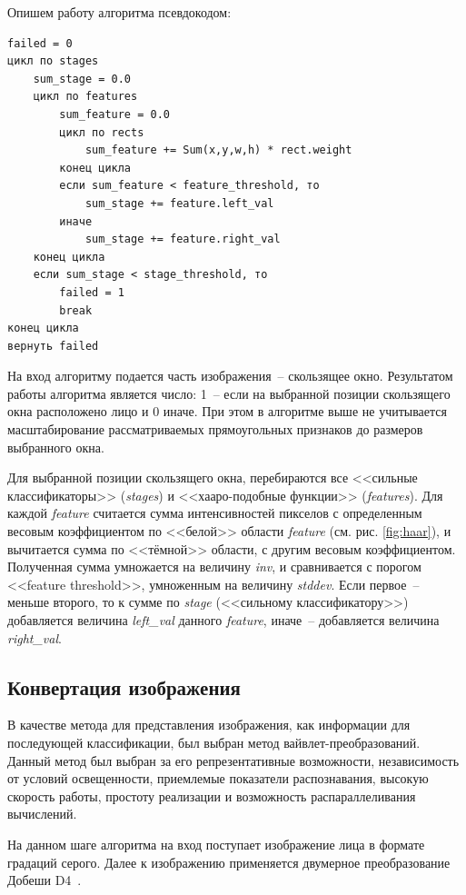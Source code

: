 Опишем работу алгоритма псевдокодом:
\begin{verbatim}
failed = 0
цикл по stages
    sum_stage = 0.0
    цикл по features
        sum_feature = 0.0
        цикл по rects
            sum_feature += Sum(x,y,w,h) * rect.weight
        конец цикла
        если sum_feature < feature_threshold, то
            sum_stage += feature.left_val
        иначе
            sum_stage += feature.right_val
    конец цикла
    если sum_stage < stage_threshold, то
        failed = 1
        break
конец цикла
вернуть failed
\end{verbatim}

На вход алгоритму подается часть изображения~-- скользящее окно.
Результатом работы алгоритма является число: 1~-- если на выбранной позиции скользящего окна расположено лицо и 0 иначе.
При этом в алгоритме выше не учитывается масштабирование рассматриваемых прямоугольных признаков
до размеров выбранного окна.

Для выбранной позиции скользящего окна, перебираются все <<сильные
классификаторы>> (\textit{stages}) и <<хааро-подобные функции>> (\textit{features}). Для каждой
\textit{feature} считается сумма интенсивностей пикселов с определенным весовым
коэффициентом по <<белой>> области \textit{feature} (см. рис. \ref{fig:haar}), и вычитается сумма
по <<тёмной>> области, с другим весовым коэффициентом. Полученная сумма
умножается на величину \textit{inv}, и сравнивается
с порогом <<feature threshold>>, умноженным на величину \textit{stddev}. Если первое~--
меньше второго, то к сумме по \textit{stage} (<<сильному классификатору>>) добавляется
величина \textit{left\_val} данного \textit{feature}, иначе~-- добавляется величина \textit{right\_val}.

\subsection{Конвертация изображения}

В качестве метода для представления
изображения, как информации для последующей классификации, был выбран метод
вайвлет-преобразований. Данный метод был выбран за его репрезентативные
возможности, независимость от условий освещенности, приемлемые показатели
распознавания, высокую скорость работы, простоту реализации и возможность
распараллеливания вычислений.

На данном шаге алгоритма на вход поступает изображение лица в формате градаций серого.
Далее к изображению применяется двумерное преобразование Добеши D4~\cite{vaivlet_1}.

